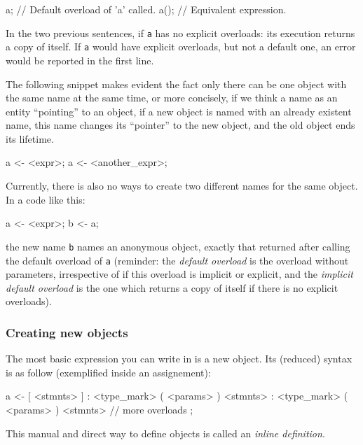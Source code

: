 \documentclass{article}
\begin{document}
\begin{faupp2}
  a;    // Default overload of 'a' called.
  a();  // Equivalent expression.
\end{faupp2}

In the two previous sentences, if \texttt{a} has no explicit overloads: its
execution returns a copy of itself. If \texttt{a} would have explicit overloads,
but not a default one, an error would be reported in the first line.

The following snippet makes evident the fact only there can be one object with
the same name at the same time, or more concisely, if we think a name as an
entity ``pointing'' to an object, if a new object is named with an already
existent name, this name changes its ``pointer'' to the new object, and the old
object ends its lifetime.

\begin{faupp2}
  a <- <expr>;
  a <- <another_expr>;
\end{faupp2}

Currently, there is also no ways to create two different names for the same
object. In a code like this:

\begin{faupp2}
  a <- <expr>;
  b <- a;
\end{faupp2}

the new name \texttt{b} names an anonymous object, exactly that returned after
calling the default overload of \texttt{a} (reminder: the \textit{default
  overload} is the overload without parameters, irrespective of if this overload
is implicit or explicit, and the \textit{implicit default overload} is the one
which returns a copy of itself if there is no explicit overloads).

\subsubsection{Creating new objects}
The most basic expression you can write in \faupp is a new object. Its (reduced)
syntax is as follow (exemplified inside an assignement):

\begin{faupp2}
  a <- [ <stmnts> ]
       : <type_mark> ( <params> )
         { <stmnts> }
       : <type_mark> ( <params> )
         { <stmnts> }
       // more overloads
       ;
\end{faupp2}

This manual and direct way to define objects is called an \textit{inline
  definition}.
\end{document}
